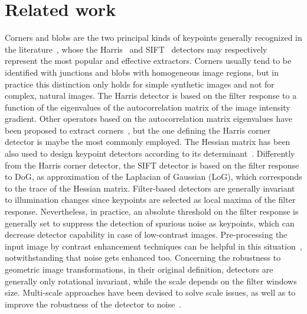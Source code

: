 \documentclass[times,twocolumn,final,authoryear]{elsarticle}
\begin{document}
\section{Related work}\label{related_work}
\vspace{-0.75em}
Corners and blobs are the two principal kinds of keypoints generally recognized in the literature~\citep{szeliski_book}, whose the Harris~\citep{harris} and SIFT~\citep{sift} detectors may respectively represent the most popular and effective extractors. Corners usually tend to be identified with junctions and blobs with homogeneous image regions, but in practice this distinction only holds for simple synthetic images and not for complex, natural images. The Harris detector is based on the filter response to a function of the eigenvalues of the autocorrelation matrix of the image intensity gradient. Other operators based on the autocorrelation matrix eigenvalues have been proposed to extract corners~\citep{forstner,shitomasi}, but the one defining the Harris corner detector is maybe the most commonly employed. The Hessian matrix has been also used to design keypoint detectors according to its determinant~\citep{beaudet}. Differently from the Harris corner detector, the SIFT detector is based on the filter response to DoG, as approximation of the Laplacian of Gaussian (LoG), which corresponds to the trace of the Hessian matrix. Filter-based detectors are generally invariant to illumination changes since keypoints are selected as local maxima of the filter response. Nevertheless, in practice, an absolute threshold on the filter response is generally set to suppress the detection of spurious noise as keypoints, which can decrease detector capability in case of low-contrast images. Pre-processing the input image by contrast enhancement techniques can be helpful in this situation~\citep{contrast_det}, notwithstanding that noise gets enhanced too. Concerning the robustness to geometric image transformations, in their original definition, detectors are generally only rotational invariant, while the scale depends on the filter windows size. Multi-scale approaches have been devised to solve scale issues, as well as to improve the robustness of the detector to noise~\citep{hess_lapl_affine}.
\end{document}
